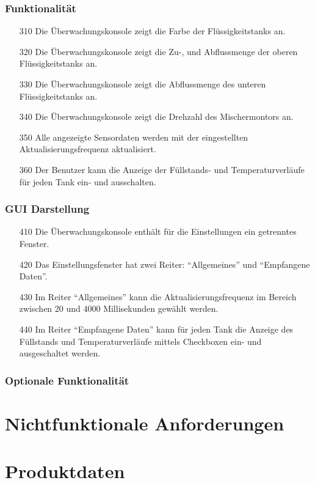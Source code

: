 \documentclass[parskip=full]{scrartcl}
\begin{document}
\subsubsection{Funktionalität}
\begin{enumerate}
\item[310] Die Überwachungskonsole zeigt die Farbe der Flüssigkeitstanks an.
\item[320] Die Überwachungskonsole zeigt die Zu-, und Abflussmenge der oberen Flüssigkeitstanks an.
\item[330] Die Überwachungskonsole zeigt die Abflussmenge des unteren Flüssigkeitstanks an.
\item[340] Die Überwachungskonsole zeigt die Drehzahl des Mischermontors an.
\item[350] Alle angezeigte Sensordaten werden mit der eingestellten Aktualisierungsfrequenz aktualisiert.
\item[360] Der Benutzer kann die Anzeige der Füllstands- und Temperaturverläufe für jeden Tank ein- und ausschalten.
\end{enumerate}
\subsubsection{GUI Darstellung}
\begin{enumerate}
\item[410] Die Überwachungskonsole enthält für die Einstellungen ein getrenntes Fenster.
\item[420] Das Einstellungsfenster hat zwei Reiter: ``Allgemeines'' und ``Empfangene Daten''.
\item[430] Im Reiter ``Allgemeines'' kann die Aktualisierungsfrequenz im Bereich zwischen 20 und 4000 Millisekunden gewählt werden.
\item[440] Im Reiter ``Empfangene Daten'' kann für jeden Tank die Anzeige des Füllstands und Temperaturverläufe mittels Checkboxen ein- und ausgeschaltet werden.
\end{enumerate}
\subsubsection{Optionale Funktionalität}

\section{Nichtfunktionale Anforderungen}
\Blindtext[1]

\section{Produktdaten}
\Blindtext[1]
\end{document}
